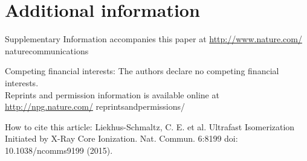 \documentclass[10pt]{article}
\begin{document}
\section*{Additional information}
Supplementary Information accompanies this paper at \href{http://www.nature.com/}{http://www.nature.com/} naturecommunications

Competing financial interests: The authors declare no competing financial interests.\\
Reprints and permission information is available online at \href{http://npg.nature.com/}{http://npg.nature.com/} reprintsandpermissions/

How to cite this article: Liekhus-Schmaltz, C. E. et al. Ultrafast Isomerization Initiated by X-Ray Core Ionization. Nat. Commun. 6:8199 doi: 10.1038/ncomms9199 (2015).
\end{document}
